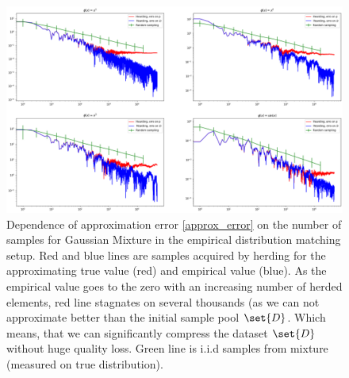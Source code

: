 \documentclass[tablecaption=bottom,wcp]{jmlr} %
\begin{document}
        \begin{figure}
            \includegraphics[width=\textwidth]{images/empirical}
            \caption{Dependence of approximation error \eqref{approx_error} on the number of samples for Gaussian Mixture in the empirical distribution matching setup. Red and blue lines are samples acquired by herding for the approximating true value (red) and empirical value (blue). As the empirical value goes to the zero with an increasing number of herded elements, red line stagnates on several thousands (as we can not approximate better than the initial sample pool $\set{D}$. Which means, that we can significantly compress the dataset $\set{D}$ without huge quality loss. Green line is i.i.d samples from mixture (measured on true distribution).}
            \label{fig:empirical}
        \end{figure}
\end{document}
